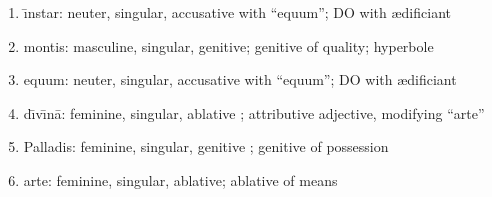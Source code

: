 \documentclass[]{article}
\begin{document}
\begin{enumerate}
\begin{enumerate}
	\item \={\i}nstar: neuter, singular, accusative with ``equum''; DO with {\ae}dificiant

	\item montis: masculine, singular, genitive; genitive of quality; hyperbole

	\item equum: neuter, singular, accusative with ``equum''; DO with {\ae}dificiant

	\item d\={\i}v\={\i}n\={a}:   feminine, singular, ablative ; attributive adjective, modifying ``arte''

	\item Palladis: feminine, singular, genitive ; genitive of possession

	\item arte: feminine, singular, ablative; ablative of means

\end{enumerate}
        
\end{enumerate}
\end{document}
